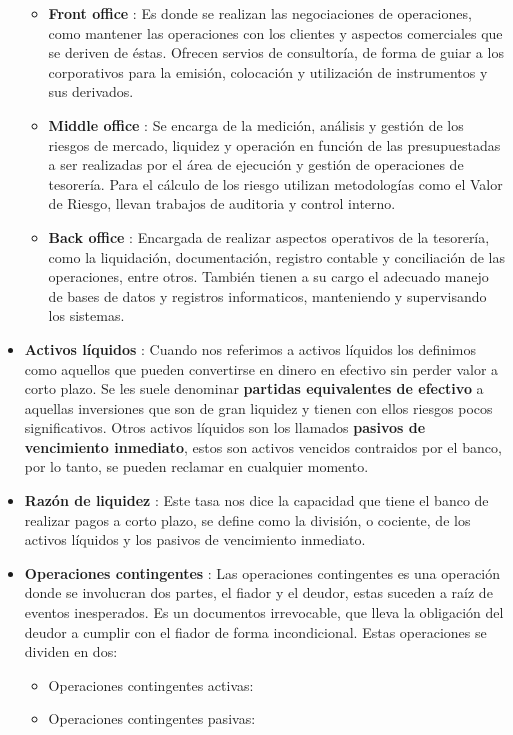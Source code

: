 \documentclass[]{article}
\providecommand{\tightlist}{%
  \setlength{\itemsep}{0pt}\setlength{\parskip}{0pt}}
\begin{document}
\begin{itemize}
  \begin{itemize}
  \item
    \textbf{Front office} : Es donde se realizan las negociaciones de
    operaciones, como mantener las operaciones con los clientes y
    aspectos comerciales que se deriven de éstas. Ofrecen servios de
    consultoría, de forma de guiar a los corporativos para la emisión,
    colocación y utilización de instrumentos y sus derivados.
  \item
    \textbf{Middle office} : Se encarga de la medición, análisis y
    gestión de los riesgos de mercado, liquidez y operación en función
    de las presupuestadas a ser realizadas por el área de ejecución y
    gestión de operaciones de tesorería. Para el cálculo de los riesgo
    utilizan metodologías como el Valor de Riesgo, llevan trabajos de
    auditoria y control interno.
  \item
    \textbf{Back office} : Encargada de realizar aspectos operativos de
    la tesorería, como la liquidación, documentación, registro contable
    y conciliación de las operaciones, entre otros. También tienen a su
    cargo el adecuado manejo de bases de datos y registros informaticos,
    manteniendo y supervisando los sistemas.
  \end{itemize}
\item
  \textbf{Activos líquidos} : Cuando nos referimos a activos líquidos
  los definimos como aquellos que pueden convertirse en dinero en
  efectivo sin perder valor a corto plazo. Se les suele denominar
  \textbf{partidas equivalentes de efectivo} a aquellas inversiones que
  son de gran liquidez y tienen con ellos riesgos pocos significativos.
  Otros activos líquidos son los llamados \textbf{pasivos de vencimiento
  inmediato}, estos son activos vencidos contraidos por el banco, por lo
  tanto, se pueden reclamar en cualquier momento.
\item
  \textbf{Razón de liquidez} : Este tasa nos dice la capacidad que tiene
  el banco de realizar pagos a corto plazo, se define como la división,
  o cociente, de los activos líquidos y los pasivos de vencimiento
  inmediato.
\item
  \textbf{Operaciones contingentes} : Las operaciones contingentes es
  una operación donde se involucran dos partes, el fiador y el deudor,
  estas suceden a raíz de eventos inesperados. Es un documentos
  irrevocable, que lleva la obligación del deudor a cumplir con el
  fiador de forma incondicional. Estas operaciones se dividen en dos:

  \begin{itemize}
  \tightlist
  \item
    Operaciones contingentes activas:
  \item
    Operaciones contingentes pasivas:
  \end{itemize}
\end{itemize}
\end{document}
